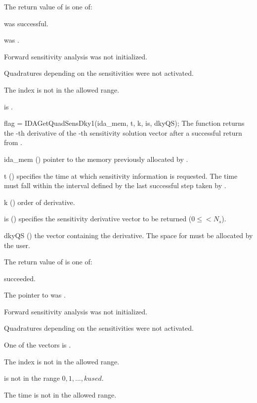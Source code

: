 {
  The return value  of  is one of:
  \begin{args}
  \item[\Id{IDA\_SUCCESS}]
     was successful.
  \item[\Id{IDA\_MEM\_NULL}] 
     was .
  \item[\Id{IDA\_NO\_SENS}] 
    Forward sensitivity analysis was not initialized.
  \item[\Id{IDA\_NO\_QUADSENS}] 
    Quadratures depending on the sensitivities were not activated.
  \item[\Id{IDA\_BAD\_IS}]
    The index  is not in the allowed range.
  \item[\Id{IDA\_BAD\_DKY}] 
     is .
  \end{args}
}
{}
{
  flag = IDAGetQuadSensDky1(ida\_mem, t, k, is, dkyQS);
}
{
  The function  returns the -th derivative of the 
  -th sensitivity solution vector after a successful 
  return from .
}
{
  \begin{args}
  \item[ida\_mem] ()
    pointer to the memory previously allocated by .
  \item[t] ()
    specifies the time at which sensitivity information is 
    requested. The time  must fall within the interval defined by the last 
    successful step taken by {\idas}.
  \item[k] () order of derivative.
  \item[is] () specifies the sensitivity derivative vector to be returned
    ($0\le$$< N_s$).
  \item[dkyQS] ()
    the vector containing the derivative. The space for  must be allocated by 
    the user. 
  \end{args}
}
{
  The return value  of  is one of:
  \begin{args}
  \item[\Id{IDA\_SUCCESS}] 
     succeeded.
  \item[\Id{IDA\_MEM\_NULL}] 
    The pointer to  was .
  \item[\Id{IDA\_NO\_SENS}] 
    Forward sensitivity analysis was not initialized.
  \item[\Id{IDA\_NO\_QUADSENS}] 
    Quadratures depending on the sensitivities were not activated.
  \item[\Id{IDA\_BAD\_DKY}] 
    One of the vectors  is .
  \item[\Id{IDA\_BAD\_IS}]
    The index  is not in the allowed range.
  \item[\Id{IDA\_BAD\_K}] 
     is not in the range $0, 1, ..., kused$.
  \item[\Id{IDA\_BAD\_T}] 
    The time  is not in the allowed range.
  \end{args}
}
{}


